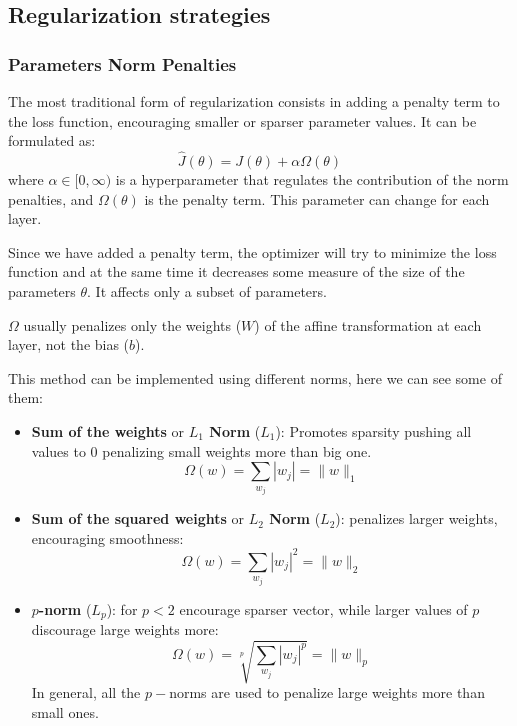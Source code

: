 \subsection{Regularization strategies}
\subsubsection{Parameters Norm Penalties}
The most traditional form of regularization consists in adding a penalty term to
the loss function, encouraging smaller or sparser parameter values. It can be
formulated as:
\begin{equation}
    \hat{J}(\theta) = J(\theta) + \alpha \Omega(\theta)
\end{equation}
where $\alpha \in [0, \infty)$ is a hyperparameter that regulates the contribution
of the norm penalties, and $\Omega(\theta)$ is the penalty term. This parameter
can change for each layer.

Since we have added a penalty term, the optimizer will try to minimize the loss
function and at the same time it decreases some measure of the size of the
parameters $\theta$. It affects only a subset of parameters.

$\Omega$ usually penalizes only the weights ($W$) of the affine transformation
at each layer, not the bias ($b$).

This method can be implemented using different norms, here we can see some of them:
\begin{itemize}
    \item \textbf{Sum of the weights} or \textbf{$L_1$ Norm} ($L_1$): Promotes
          sparsity pushing all values to $0$ penalizing small weights more than big one.
          \begin{equation}
              \Omega(w) = \sum_{w_j}|w_j| = \|w\|_1
          \end{equation}
    \item \textbf{Sum of the squared weights} or \textbf{$L_2$ Norm} ($L_2$):
          penalizes larger weights, encouraging smoothness:
          \begin{equation}
              \Omega(w) = \sum_{w_j}|w_j|^2 = \|w\|_2
          \end{equation}
    \item \textbf{$p$-norm} ($L_p$): for $p < 2$ encourage sparser vector, while
          larger values of $p$ discourage large weights more:
          \begin{equation}
              \Omega(w) = \sqrt[p]{\sum_{w_j}|w_j|^p} = \|w\|_p
          \end{equation}
          In general, all the $p-$norms are used to penalize large weights more
          than small ones.
\end{itemize}

